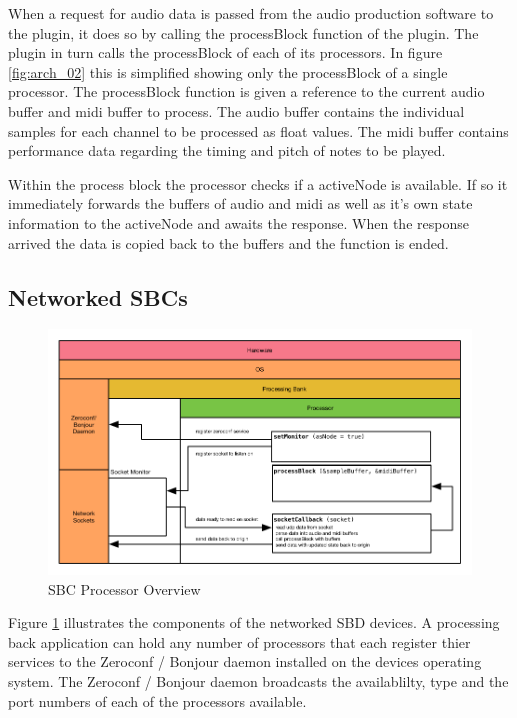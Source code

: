 When a request for audio data is passed from the audio production software to the plugin, it does so by calling the processBlock function of the plugin. The plugin in turn calls the processBlock of each of its processors. In figure \ref{fig:arch_02} this is simplified showing only the processBlock of a single processor. The processBlock function is given a reference to the current audio buffer and midi buffer to process. The audio buffer contains the individual samples for each channel to be processed as float values. The midi buffer contains performance data regarding the timing and pitch of notes to be played.

Within the process block the processor checks if a activeNode is available. If so it immediately forwards the buffers of audio and midi as well as it's own state information to the activeNode and awaits the response. When the response arrived the data is copied back to the buffers and the function is ended.

\subsection{Networked SBCs}

\begin{figure}[H]
    \centering
    \includegraphics[width=\textwidth]{assets/architecture_03.pdf}
    \caption{SBC Processor Overview}
    \label{fig:arch_03}
\end{figure}

Figure \ref{fig:arch_03} illustrates the components of the networked SBD devices. A processing back application can hold any number of processors that each register thier services to the Zeroconf / Bonjour daemon installed on the devices operating system. The Zeroconf / Bonjour daemon broadcasts the availablilty, type and the port numbers of each of the processors available.

